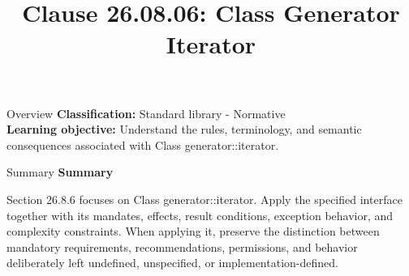 \documentclass[10pt,letterpaper]{article}
\title{Clause 26.08.06: Class Generator Iterator}
\author{}
\date{}
\begin{document}
\maketitle
\begin{CornellOverviewBox}{Overview}
\textbf{Classification:} Standard library - Normative\\[2pt]
\textbf{Learning objective:} Understand the rules, terminology, and semantic consequences associated with Class generator::iterator.
\end{CornellOverviewBox}\begin{CornellSummaryBox}{Summary}
{\sffamily\bfseries\color{Accent} Summary}\par\vspace{3pt}Section 26.8.6 focuses on Class generator::iterator. Apply the specified interface together with its mandates, effects, result conditions, exception behavior, and complexity constraints. When applying it, preserve the distinction between mandatory requirements, recommendations, permissions, and behavior deliberately left undefined, unspecified, or implementation-defined.
\end{CornellSummaryBox}
\end{document}

